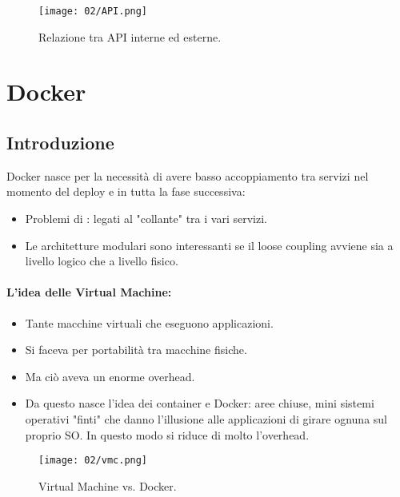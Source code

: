
\begin{figure}[h]
	\centering
	\texttt{[image: 02/API.png]}
	\caption{Relazione tra API interne ed esterne.}
\end{figure}

\section{Docker}

\subsection{Introduzione}

Docker nasce per la necessità di avere basso accoppiamento tra servizi nel momento del deploy e in tutta la fase successiva:

\begin{itemize}
	\item Problemi di : legati al "collante" tra i vari servizi.
	\item Le architetture modulari sono interessanti se il loose coupling avviene sia a livello logico che a livello fisico.
\end{itemize}

\paragraph{L'idea delle Virtual Machine:}

\begin{itemize}
	\item Tante macchine virtuali che eseguono applicazioni.
	\item Si faceva per portabilità tra macchine fisiche.
	\item Ma ciò aveva un enorme overhead.
	\item Da questo nasce l'idea dei container e Docker: aree chiuse, mini sistemi operativi "finti" che danno l'illusione alle applicazioni di girare ognuna sul proprio SO. In questo modo si riduce di molto l'overhead.
\end{itemize}

\begin{figure}[h]
	\centering
	\texttt{[image: 02/vmc.png]}
	\caption{Virtual Machine vs. Docker.}
\end{figure}



